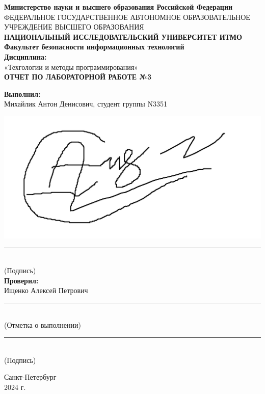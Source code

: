 \documentclass[a4paper, 12pt]{article}
\begin{document}
\thispagestyle{empty}
\begin{center}
    \textbf{Министерство науки и высшего образования Российской Федерации}\\
    ФЕДЕРАЛЬНОЕ ГОСУДАРСТВЕННОЕ АВТОНОМНОЕ ОБРАЗОВАТЕЛЬНОЕ УЧРЕЖДЕНИЕ ВЫСШЕГО ОБРАЗОВАНИЯ\\
    \textbf{НАЦИОНАЛЬНЫЙ ИССЛЕДОВАТЕЛЬСКИЙ УНИВЕРСИТЕТ ИТМО}\\[40pt]
    \textbf{Факультет безопасности информационных технологий}\\[40pt]
    \textbf{Дисциплина:}\\[10pt]
    «Техгологии и методы программирования»\\[30pt]
    \textbf{ОТЧЕТ ПО ЛАБОРАТОРНОЙ РАБОТЕ №3}\\[148pt]
\end{center}
\begin{flushright}
    \textbf{Выполнил:}\\[5pt]
    Михайлик Антон Денисович, студент группы N3351
    \begin{minipage}{0.7\textwidth}
        \hfill 
        \end{minipage}%
        \hfill
        \begin{minipage}{0.2\textwidth}
          \includegraphics[width=\linewidth]{sig.jpg}
    \end{minipage}
    \rule{150pt}{1.5pt}\\
    (Подпись)\\[20pt]

    \textbf{Проверил:}\\[5pt]
    Ищенко Алексей Петрович\\[20pt]
    \rule{150pt}{1.5pt}\\
    (Отметка о выполнении)\\[20pt]
    \rule{150pt}{1.5pt}\\
    (Подпись)\\[55pt]
\end{flushright}
\begin{center}
    Санкт-Петербург\\[3pt]
    2024 г.
\end{center}
\end{document}
